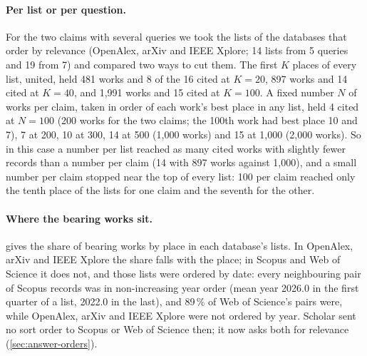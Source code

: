 \paragraph{Per list or per question.}
For the two claims with several queries we took the lists of the
databases that order by relevance (OpenAlex, arXiv and IEEE Xplore;
14 lists from 5 queries and 19 from 7) and compared two ways to cut them.
The first $K$ places of every list, united, held 481 works and 8 of the
16 cited at $K=20$, 897 works and 14 cited at $K=40$, and 1,991 works
and 15 cited at $K=100$.
A fixed number $N$ of works per claim, taken in order of each work's best
place in any list, held 4 cited at $N=100$ (200 works for the two claims;
the 100th work had best place 10 and 7), 7 at 200, 10 at 300, 14 at
500 (1,000 works) and 15 at 1,000 (2,000 works).
So in this case a number per list reached as many cited works with
slightly fewer records than a number per claim (14 with 897 works against
1,000), and a small number per claim stopped near the top of every list:
100 per claim reached only the tenth place of the lists for one claim
and the seventh for the other.

\paragraph{Where the bearing works sit.}
 gives the share of bearing works by place
in each database's lists.
In OpenAlex, arXiv and IEEE Xplore the share falls with the place; in
Scopus and Web of Science it does not, and those lists were ordered by
date: every neighbouring pair of Scopus records was in non-increasing
year order (mean year 2026.0 in the first quarter of a list, 2022.0 in
the last), and 89\,\% of Web of Science's pairs were, while OpenAlex,
arXiv and IEEE Xplore were not ordered by year.
Scholar sent no sort order to Scopus or Web of Science then; it now asks
both for relevance (\cref{sec:answer-orders}).

